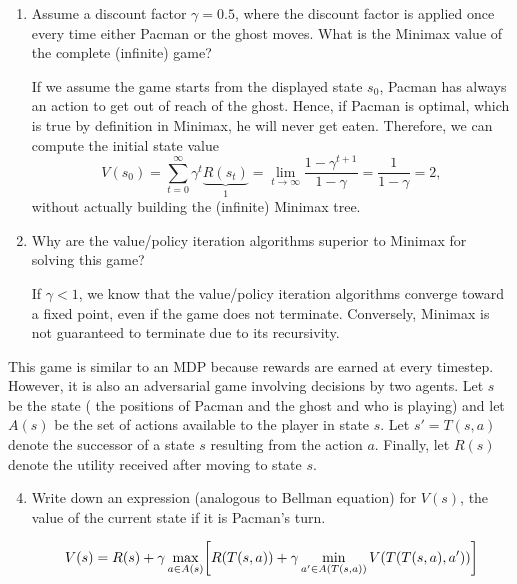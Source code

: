 \documentclass[11pt, a4paper]{article}
\begin{document}
\begin{enumerate}
    \item Assume a discount factor $\gamma = 0.5$, where the discount factor is applied once every time either Pacman or the ghost moves. What is the Minimax value of the complete (infinite) game?
    
    \begin{solution}
        If we assume the game starts from the displayed state $s_0$, Pacman has always an action to get out of reach of the ghost. Hence, if Pacman is optimal, which is true by definition in Minimax, he will never get eaten. Therefore, we can compute the initial state value
        \begin{equation*}
            V(s_0) = \sum_{t = 0}^\infty \gamma^t \underbrace{R(s_t)}_{1} = \lim_{t \to \infty} \frac{1 - \gamma^{t+1}}{1 - \gamma} = \frac{1}{1 - \gamma} = 2 ,
        \end{equation*}
        without actually building the (infinite) Minimax tree.
    \end{solution}
    
    \item Why are the value/policy iteration algorithms superior to Minimax for solving this game?
    
    \begin{solution}
        If $\gamma < 1$, we know that the value/policy iteration algorithms converge toward a fixed point, even if the game does not terminate. Conversely, Minimax is not guaranteed to terminate due to its recursivity.
    \end{solution}
    
\end{enumerate}

This game is similar to an MDP because rewards are earned at every timestep. However, it is also an adversarial game involving decisions by two agents. Let $s$ be the state (\eg{} the positions of Pacman and the ghost and who is playing) and let $A(s)$ be the set of actions available to the player in state $s$. Let $s' = T(s, a)$ denote the successor of a state $s$ resulting from the action $a$. Finally, let $R(s)$ denote the utility received after moving to state $s$.

\begin{enumerate}
    \setcounter{enumi}{3}
    \item Write down an expression (analogous to Bellman equation) for $V(s)$, the value of the current state if it is Pacman's turn.
    
    \begin{solution}
        \begin{equation*}
            V(s) = R(s) + \gamma \max_{a \in A(s)} \sbk*{ R(T(s, a)) + \gamma \min_{a' \in A(T(s, a))} V(T(T(s, a), a')) }
        \end{equation*}
    \end{solution}
\end{enumerate}
\end{document}
